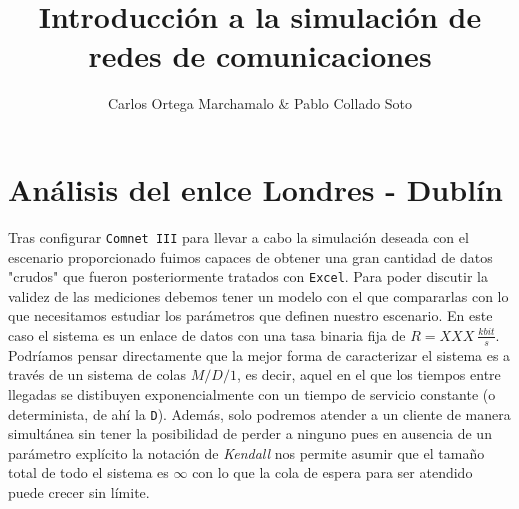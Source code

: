 \documentclass{article}[12 pt]
\title{Introducción a la simulación de redes de comunicaciones}
\author{Carlos Ortega Marchamalo \& Pablo Collado Soto}
\date{}
\begin{document}
	\maketitle

	\section{Análisis del enlce Londres - Dublín}
		Tras configurar \texttt{Comnet III} para llevar a cabo la simulación deseada con el escenario proporcionado fuimos capaces de obtener una gran cantidad de datos "crudos" que fueron posteriormente tratados con \texttt{Excel}. Para poder discutir la validez de las mediciones debemos tener un modelo con el que compararlas con lo que necesitamos estudiar los parámetros que definen nuestro escenario. En este caso el sistema es un enlace de datos con una tasa binaria fija de $R = XXX\ \frac{kbit}{s}$. Podríamos pensar directamente que la mejor forma de caracterizar el sistema es a través de un sistema de colas $M/D/1$, es decir, aquel en el que los tiempos entre llegadas se distibuyen exponencialmente con un tiempo de servicio constante (o determinista, de ahí la \texttt{D}). Además, solo podremos atender a un cliente de manera simultánea sin tener la posibilidad de perder a ninguno pues en ausencia de un parámetro explícito la notación de \textit{Kendall} nos permite asumir que el tamaño total de todo el sistema es $\infty$ con lo que la cola de espera para ser atendido puede crecer sin límite.
		\\
\end{document}
